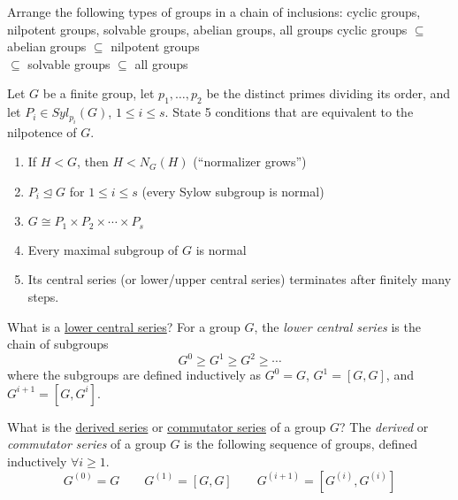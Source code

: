 \documentclass[avery5371,grid]{flashcards}
\begin{document}
\begin{flashcard}[Groups]{Arrange the following types of groups in a chain of inclusions: cyclic groups, nilpotent groups, solvable groups, abelian groups, all groups}
 cyclic groups $\subseteq$ abelian groups $\subseteq$ nilpotent groups\\ $\subseteq$ solvable groups $\subseteq$ all groups
\end{flashcard}

\begin{flashcard}[Groups]{Let $G$ be a finite group, let $p_1, \ldots, p_2$ be the distinct primes dividing its order, and let $P_i \in Syl_{p_i}(G)$, $1 \leq i \leq s$. State 5 conditions that are equivalent to the nilpotence of $G$.}
 \begin{enumerate}
      \item If $H < G$, then $H < N_G(H)$ (``normalizer grows'')
      \item $P_i \trianglelefteq G$ for $1 \leq i \leq s$ (every Sylow subgroup is normal)
      \item $G \cong P_1 \times P_2 \times \cdots \times P_s$
      \item Every maximal subgroup of $G$ is normal
      \item Its central series (or lower/upper central series) terminates after finitely many steps.
 \end{enumerate}
\end{flashcard}

\begin{flashcard}[Groups]{What is a \underline{lower central series}?}
 For a group $G$, the \emph{lower central series} is the chain of subgroups
 $$
 G^0 \geq G^1 \geq G^2 \geq \cdots
 $$
 where the subgroups are defined inductively as $G^0 = G$, $G^1 = [G,G]$, and $G^{i+1} = [G, G^{i}]$.
\end{flashcard}

\begin{flashcard}[Groups]{What is the \underline{derived series} or \underline{commutator series} of a group $G$?}
 The \emph{derived} or \emph{commutator series} of a group $G$ is the following sequence of groups, defined inductively $\forall i \geq 1$.
 $$
 G^{(0)} = G \qquad G^{(1)} = [G,G] \qquad G^{(i+1)} = [G^{(i)}, G^{(i)}]
 $$
\end{flashcard}
\end{document}
